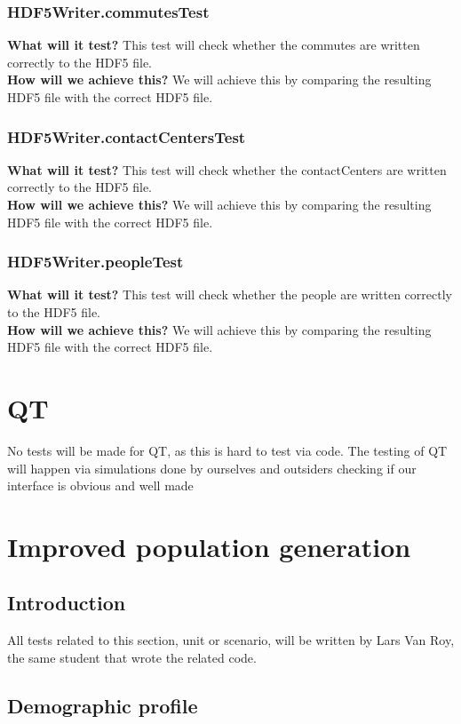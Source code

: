 \documentclass{article}
\begin{document}
\subsubsection{HDF5Writer.commutesTest}
\textbf{What will it test?}
This test will check whether the commutes are written correctly to the HDF5 file. \\
\newline 
\textbf{How will we achieve this?}
We will achieve this by comparing the resulting HDF5 file with the correct HDF5 file.

\subsubsection{HDF5Writer.contactCentersTest}
\textbf{What will it test?}
This test will check whether the contactCenters are written correctly to the HDF5 file. \\
\newline
\textbf{How will we achieve this?}
We will achieve this by comparing the resulting HDF5 file with the correct HDF5 file.

\subsubsection{HDF5Writer.peopleTest}
\textbf{What will it test?}
This test will check whether the people are written correctly to the HDF5 file. \\
\newline
\textbf{How will we achieve this?}
We will achieve this by comparing the resulting HDF5 file with the correct HDF5 file.
\section{QT}
No tests will be made for QT, as this is hard to test via code. The testing of QT will happen via simulations done by ourselves and outsiders checking if our interface is obvious and well made
\section{Improved population generation}
\subsection{Introduction}
All tests related to this section, unit or scenario, will be written by Lars Van Roy, the same student that wrote the related code.
\subsection{Demographic profile}
\end{document}
